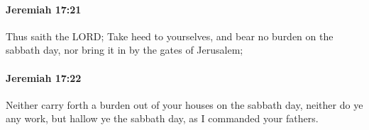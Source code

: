 		\paragraph{Jeremiah 17:21} %
			\label{JEREMIAH-17-21}

			Thus saith the LORD; Take heed to yourselves, and bear no burden on the sabbath day, nor bring it in by the gates of Jerusalem;


		\paragraph{Jeremiah 17:22} %
			\label{JEREMIAH-17-22}

			Neither carry forth a burden out of your houses on the sabbath day, neither do ye any work, but hallow ye the sabbath day, as I commanded your fathers.


